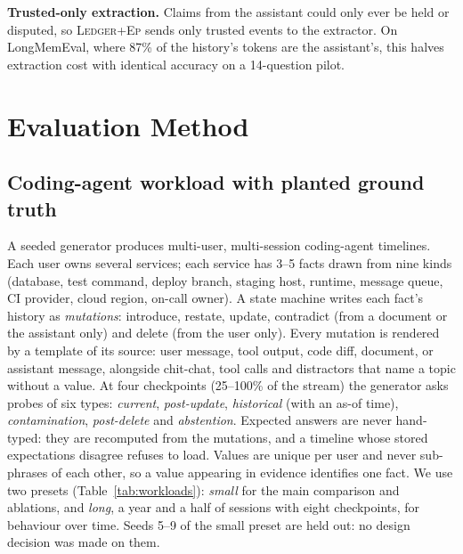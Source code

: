 \documentclass[10pt,conference]{IEEEtran}
\newcommand{\hyb}{\textsc{Ledger+Ep}}
\begin{document}
\textbf{Trusted-only extraction.} Claims from the assistant could only ever
be held or disputed, so \hyb{} sends only trusted events to the extractor.
On LongMemEval, where 87\% of the history's tokens are the assistant's, this
halves extraction cost with identical accuracy on a 14-question pilot.

\section{Evaluation Method}
\label{sec:method}

\subsection{Coding-agent workload with planted ground truth}
\label{sec:workload}

A seeded generator produces multi-user, multi-session coding-agent timelines.
Each user owns several services; each service has 3--5 facts drawn from nine
kinds (database, test command, deploy branch, staging host, runtime, message
queue, CI provider, cloud region, on-call owner). A state machine writes each
fact's history as \emph{mutations}: introduce, restate, update, contradict
(from a document or the assistant only) and delete (from the user only).
Every mutation is rendered by a template of its source: user message, tool
output, code diff, document, or assistant message, alongside chit-chat,
tool calls and distractors that name a topic without a value. At four
checkpoints (25--100\% of the stream) the generator asks probes of six types:
\emph{current}, \emph{post-update}, \emph{historical} (with an as-of time),
\emph{contamination}, \emph{post-delete} and \emph{abstention}. Expected
answers are never hand-typed: they are recomputed from the mutations, and a
timeline whose stored expectations disagree refuses to load. Values are unique
per user and never sub-phrases of each other, so a value appearing in evidence
identifies one fact. We use two presets (Table~\ref{tab:workloads}): \emph{small}
for the main comparison and ablations, and \emph{long}, a year and a half of
sessions with eight checkpoints, for behaviour over time. Seeds 5--9 of the
small preset are held out: no design decision was made on them.
\end{document}
